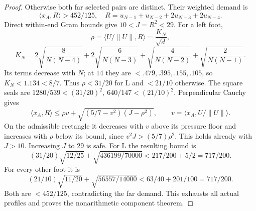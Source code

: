 \documentclass[11pt]{article}
\theoremstyle{definition}
\theoremstyle{remark}
\newcommand{\ip}[2]{\langle #1,#2\rangle}
\newcommand{\norm}[1]{\lVert #1\rVert}
\begin{document}
\begin{proof}
Otherwise both far selected pairs are distinct.
Their weighted demand is
\[
 \ip{x_A}{R}>452/125,\quad
 R=u_{N-1}+u_{N-2}+2u_{N-3}+2u_{N-4}.
\]
Direct within-end Gram bounds give \(10<J=R^2<29\).
For a left foot,
\[
 \rho=\ip{U/\norm U}{R}=\frac{K_N}{\sqrt d},
\]
\[
 K_N=2\sqrt{\frac8{N(N-4)}}+
 2\sqrt{\frac6{N(N-3)}}+
 \sqrt{\frac4{N(N-2)}}+\sqrt{\frac2{N(N-1)}}.
\]
Its terms decrease with \(N\); at \(14\) they are
\(<.479,.395,.155,.105\), so \(K_N<1.134<8/7\).
Thus \(\rho<31/20\) for L and \(<21/10\) otherwise.
The square seals are
\(1280/539<(31/20)^2,\ 640/147<(21/10)^2\).
Perpendicular Cauchy gives
\[
 \ip{x_A}{R}\leq
 \rho v+\sqrt{(5/7-v^2)(J-\rho^2)},\qquad
 v=\ip{x_A}{U/\norm U}.
\]
On the admissible rectangle it decreases with \(v\)
above its pressure floor and increases with \(\rho\)
below its bound, since \(v^2J>(5/7)\rho^2\).
This holds already with \(J>10\).
Increasing \(J\) to \(29\) is safe.
For L the resulting bound is
\[
 (31/20)\sqrt{12/25}+\sqrt{436199/70000}
 <217/200+5/2=717/200.
\]
For every other foot it is
\[
 (21/10)\sqrt{11/20}+\sqrt{56557/14000}
 <63/40+201/100=717/200.
\]
Both are \(<452/125\), contradicting the far demand.
This exhausts all actual profiles and proves the
nonarithmetic component theorem.
\end{proof}
\end{document}
